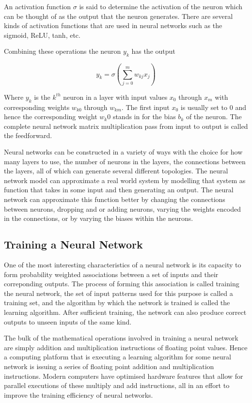 An activation function $\sigma$ is said to determine the activation of the neuron which can be thought of as the output that the neuron generates. There are several kinds of activation functions that are used in neural networks such as the sigmoid, ReLU, tanh, etc.

Combining these operations the neuron $y_k$ has the output

\begin{equation}
	y_k = \sigma \left( \sum_{j=0}^m w_{kj} x_j \right)
\end{equation}

Where $y_k$ is the $k^{th}$ neuron in a layer with input values $x_0$ through $x_m$ with corresponding weights $w_{k0}$ through $w_{km}$. The first input $x_0$ is usually set to $0$ and hence the corresponding weight $w_k0$ stands in for the bias $b_k$ of the neuron. The complete neural network matrix multiplication pass from input to output is called the feedforward.

Neural networks can be constructed in a variety of ways with the choice for how many layers to use, the number of neurons in the layers, the connections between the layers, all of which can generate several different topologies. The neural network model can approximate a real world system by modelling that system as function that takes in some input and then generating an output. The neural network can approximate this function better by changing the connections between neurons, dropping and or adding neurons, varying the weights encoded in the connections, or by varying the biases within the neurons.

\subsection{Training a Neural Network}

One of the most interesting characteristics of a neural network is its capacity to form probability weighted associations between a set of inputs and their correponding outputs. The process of forming this association is called training the neural network, the set of input patterns used for this purpose is called a training set, and the algorithm by which the network is trained is called the learning algorithm. After sufficient training, the network can also produce correct outputs to unseen inputs of the same kind.

The bulk of the mathematical operations involved in training a neural network are simply addition and multiplication instructions of floating point values. Hence a computing platform that is executing a learning algorithm for some neural network is issuing a series of floating point addition and multiplication instructions. Modern computers have optimised hardware features that allow for parallel executions of these multiply and add instructions, all in an effort to improve the training efficiency of neural networks.

